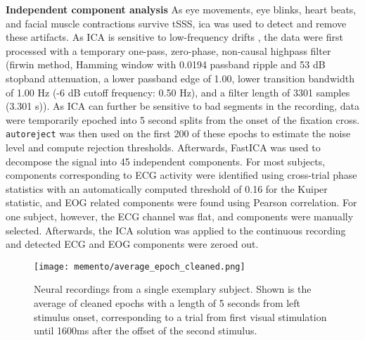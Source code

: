 \textbf{Independent component analysis} As eye movements, eye blinks, heart beats, and facial muscle contractions survive \gls{tSSS}, \gls{ica} was used to detect and remove these artifacts.
As ICA is sensitive to low-frequency drifts \citep{winkler2015ICA}, the data were first processed with a temporary one-pass, zero-phase, non-causal highpass filter (firwin method, Hamming window with 0.0194 passband ripple and 53 dB stopband attenuation, a lower passband edge of 1.00, lower transition bandwidth of 1.00 Hz (-6 dB cutoff frequency: 0.50 Hz), and a filter length of 3301 samples (3.301 s)).
As ICA can further be sensitive to bad segments in the recording, data were temporarily epoched into 5 second splits from the onset of the fixation cross.
\texttt{autoreject} was then used on the first 200 of these epochs to estimate the noise level and compute rejection thresholds.
Afterwards, FastICA \citep{hyvarinen1999fast} was used to decompose the signal into 45 independent components.
For most subjects, components corresponding to ECG activity were identified using cross-trial phase statistics \citep{dammers2008integration} with an automatically computed threshold of 0.16 for the Kuiper statistic, and EOG related components were found using Pearson correlation.
For one subject, however, the ECG channel was flat, and components were manually selected.
Afterwards, the ICA solution was applied to the continuous recording and detected ECG and EOG components were zeroed out.

\begin{figure}
	\texttt{[image: memento/average\_epoch\_cleaned.png]}
	\caption[Average neural signal over the trial course]{Neural recordings from a single exemplary subject.
		Shown is the average of cleaned epochs with a length of 5 seconds from left stimulus onset, corresponding to a trial from first visual stimulation until
		1600ms after the offset of the second stimulus.}
	\label{fig:cleanepoch}
\end{figure}

